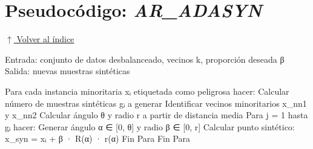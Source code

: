 \section*{Pseudocódigo: \textit{AR\_ADASYN}}
\noindent\hypertarget{pseudocodigo_ar_adasyn}{}\hyperlink{toc}{\small$\uparrow$ Volver al índice}

\begin{pseudo}
Entrada: conjunto de datos desbalanceado, vecinos k, proporción deseada β  
Salida: nuevas muestras sintéticas

Para cada instancia minoritaria xᵢ etiquetada como peligrosa hacer:  
    Calcular número de muestras sintéticas gᵢ a generar  
    Identificar vecinos minoritarios x\_nn1 y x\_nn2  
    Calcular ángulo θ y radio r a partir de distancia media  
    Para j = 1 hasta gᵢ hacer:  
        Generar ángulo α ∈ [0, θ] y radio β ∈ [0, r]  
        Calcular punto sintético:  
            x\_syn = xᵢ + β · R(α) · r(α)  
    Fin Para  
Fin Para
\end{pseudo}
